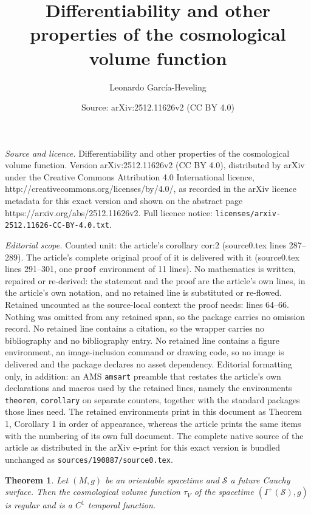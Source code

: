 \documentclass[10pt,a4paper]{amsart}
\title{Differentiability and other properties of the cosmological volume function}
\author{Leonardo Garc\'ia-Heveling}
\date{Source: arXiv:2512.11626v2 (CC BY 4.0)}
\newtheorem{theorem}{Theorem}
\newcommand{\CS}{\mathcal{S}}
\begin{document}
\maketitle

\noindent\emph{Source and licence.} Differentiability and other properties of the cosmological volume function. Version arXiv:2512.11626v2 (CC BY 4.0), distributed by arXiv under the Creative Commons Attribution 4.0 International licence, http://creativecommons.org/licenses/by/4.0/, as recorded in the arXiv licence metadata for this exact version and shown on the abstract page https://arxiv.org/abs/2512.11626v2. Full licence notice: \texttt{licenses/arxiv-2512.11626-CC-BY-4.0.txt}.\par\smallskip

\noindent\textit{Editorial scope.} Counted unit: the article's corollary cor:2 (source0.tex lines 287--289). The article's complete original proof of it is delivered with it (source0.tex lines 291--301, one \texttt{proof} environment of 11 lines). No mathematics is written, repaired or re-derived: the statement and the proof are the article's own lines, in the article's own notation, and no retained line is substituted or re-flowed.  Retained uncounted as the source-local context the proof needs: lines 64--66.  Nothing was omitted from any retained span, so the package carries no omission record.  No retained line contains a citation, so the wrapper carries no bibliography and no bibliography entry.  No retained line contains a figure environment, an image-inclusion command or drawing code, so no image is delivered and the package declares no asset dependency.  Editorial formatting only, in addition: an AMS \texttt{amsart} preamble that restates the article's own declarations and macros used by the retained lines, namely the environments \texttt{theorem}, \texttt{corollary} on separate counters, together with the standard packages those lines need.  The retained environments print in this document as Theorem 1, Corollary 1 in order of appearance, whereas the article prints the same items with the numbering of its own full document.  The complete native source of the article as distributed in the arXiv e-print for this exact version is bundled unchanged as \texttt{sources/190887/source0.tex}.
\begin{theorem} \label{thm:main}
    Let $(M,g)$ be an orientable spacetime and $\CS$ a future Cauchy surface. Then the cosmological volume function $\tau_V$ of the spacetime $(I^+(\CS),g)$ is regular and is a $C^1$ temporal function.
\end{theorem}
\end{document}
